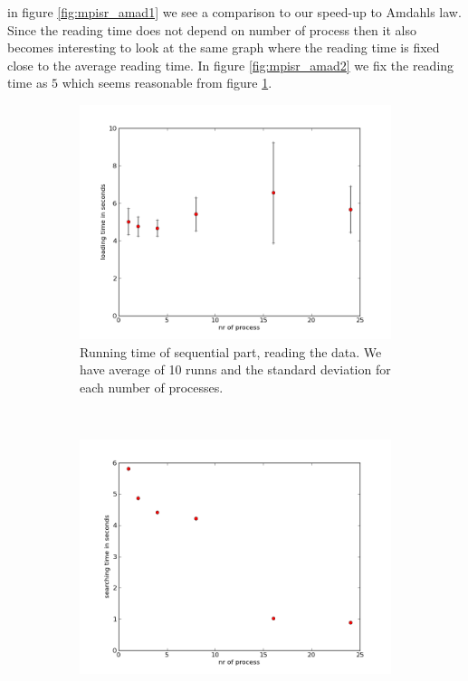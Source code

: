 \documentclass[a4paper,10pt]{article}
\begin{document}
  in figure \ref{fig:mpisr_amad1} we see a comparison to our speed-up to Amdahls law.
  Since the reading time does not depend on number of process then it also becomes interesting
  to look at the same graph where the reading time is fixed close to the average reading time.
  In figure \ref{fig:mpisr_amad2} we fix the reading time as $5$ which seems reasonable from
  figure \ref{fig:mpisr_load}.  

\begin{figure}[h!t]
        \centering
        \begin{subfigure}[b]{0.70\textwidth}
                \centering
                \includegraphics[width=\textwidth]{graphics/mpi2gb_single_reader/load_time.png}
                \caption{Running time of sequential part, reading the data. 
                         We have average of 10 runns and the standard deviation for each number
                         of processes.}
                \label{fig:mpisr_load}
        \end{subfigure}%
        \\
        \begin{subfigure}[b]{0.70\textwidth}
                \centering
                \includegraphics[width=\textwidth]{graphics/mpi2gb_single_reader/search_time.png}

\end{subfigure}
\end{figure}
\end{document}
